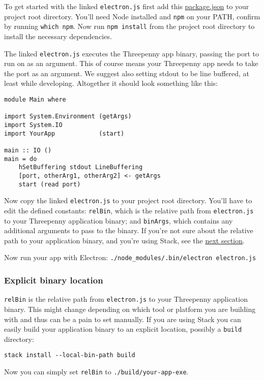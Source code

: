 \documentclass[11pt]{article}
\begin{document}
To get started with the linked \texttt{electron.js} first add this \href{'./electron/package.json'}{package.json} to your
project root directory. You'll need Node installed and \texttt{npm} on your PATH,
confirm by running \texttt{which npm}. Now run \texttt{npm install} from the project root
directory to install the necessary dependencies.

The linked \texttt{electron.js} executes the Threepenny app binary, passing the port to
run on as an argument. This of course means your Threepenny app needs to take
the port as an argument. We suggest also setting stdout to be line buffered, at
least while developing. Altogether it should look something like this:

\begin{verbatim}
module Main where

import System.Environment (getArgs)
import System.IO
import YourApp            (start)

main :: IO ()
main = do
    hSetBuffering stdout LineBuffering
    [port, otherArg1, otherArg2] <- getArgs
    start (read port)
\end{verbatim}

Now copy the linked \texttt{electron.js} to your project root directory. You'll have to
edit the defined constants: \texttt{relBin}, which is the relative path from
\texttt{electron.js} to your Threepenny application binary; and \texttt{binArgs}, which
contains any additional arguments to pass to the binary. If you're not sure
about the relative path to your application binary, and you're using Stack, see
the \hyperref[sec:orgcc92acc]{next section}.

Now run your app with Electron: \texttt{./node\_modules/.bin/electron electron.js}

\subsubsection{Explicit binary location}
\label{sec:orgcc92acc}
\texttt{relBin} is the relative path from \texttt{electron.js} to your Threepenny
application binary. This might change depending on which tool or
platform you are building with and thus can be a pain to set manually.
If you are using Stack you can easily build your application binary to
an explicit location, possibly a \texttt{build} directory:

\texttt{stack install -{}-local-bin-path build}

Now you can simply set \texttt{relBin} to \texttt{./build/your-app-exe}.
\end{document}
